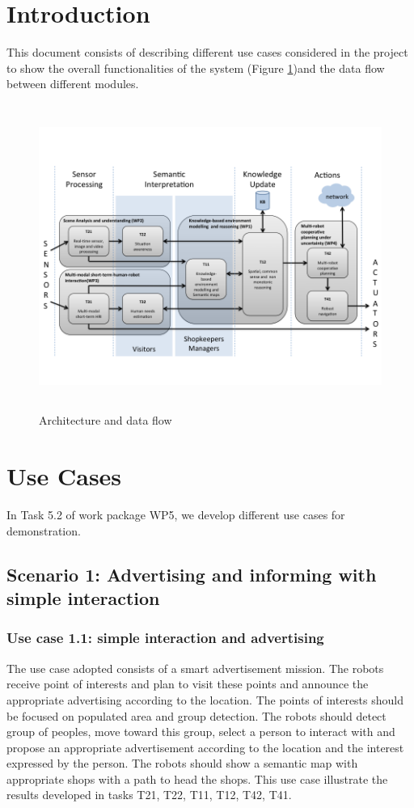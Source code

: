 \section{Introduction}

This document consists of describing different use cases considered in the project to show the overall functionalities of the system (Figure \ref{Fig-1})and the data flow between different modules. 
\begin{figure}[htbp]
\begin{center}
\includegraphics[height=10cm]{ArchitectureCoachesDF}
\caption{Architecture and data flow }
\label{Fig-1}
\end{center}
\end{figure}

\section{Use Cases}
In Task 5.2 of work package WP5, we develop different use cases for demonstration. 
\subsection{Scenario 1: Advertising and informing with simple interaction} 
\subsubsection{Use case 1.1: simple interaction and advertising} 
The use case adopted consists of a smart advertisement mission. The robots receive point of interests and plan to visit these points and announce the appropriate advertising according to the location. The points of interests should be focused on populated area and group detection. The robots should detect group of peoples, move toward this group, select a person to interact with and propose an appropriate advertisement according to the location and the interest expressed by the person. The robots should show a semantic map with appropriate shops with a path to head the shops. This use case illustrate the results developed in tasks T21, T22, T11, T12, T42, T41. 

